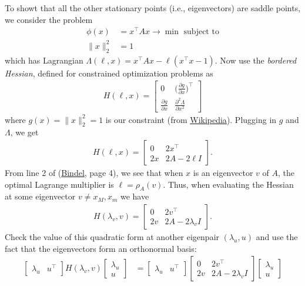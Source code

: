 \documentclass{letter}
\newcounter{problem}
\newcommand{\T}{\intercal}
\begin{document}
{    To showt that all the other stationary points (i.e., eigenvectors) are saddle points, we consider the problem \begin{align*}
        \phi(x) &= x^\T A x \rightarrow \min \text{ subject to} \\
        \|x\|_2^2 &= 1
    \end{align*} which has Lagrangian $\Lambda(\ell,x) = x^\T A x - \ell (x^\T x - 1)$. Now use the \emph{bordered Hessian}, defined for constrained optimization problems as \begin{align*}
        H(\ell,x) = \begin{bmatrix} 0 & \Big(\frac{\partial g}{\partial x}\Big)^\T \\ \frac{\partial g}{\partial x} & \frac{\partial^2 \Lambda}{\partial x^2} \end{bmatrix}
    \end{align*} where $g(x) = \|x\|_2^2 = 1$ is our constraint (from \href{https://en.wikipedia.org/wiki/Hessian_matrix\#Bordered_Hessian}{Wikipedia}). Plugging in $g$ and $\Lambda$, we get \begin{align*}
        H(\ell,x) = \begin{bmatrix} 0 & 2x^\T \\ 2x & 2A - 2\ell I \end{bmatrix}.
    \end{align*} From line 2 of (\href{http://www.cs.cornell.edu/~bindel/class/sjtu-summer19/lec/2019-05-29.pdf}{Bindel}, page 4), we see that when $x$ is an eigenvector $v$ of $A$, the optimal Lagrange multiplier is $\ell = \rho_A(v)$. Thus, when evaluating the Hessian at some eigenvector $v \neq x_M, x_m$ we have \begin{align*}
        H(\lambda_v, v) = \begin{bmatrix} 0 & 2v^\T \\ 2v & 2A - 2\lambda_vI \end{bmatrix}.
    \end{align*} Check the value of this quadratic form at another eigenpair $(\lambda_u, u)$ and use the fact that the eigenvectors form an orthonormal basis: \begin{align*}
        \begin{bmatrix} \lambda_u & u^\T \end{bmatrix} H(\lambda_v, v) \begin{bmatrix} \lambda_u \\ u \end{bmatrix} &= \begin{bmatrix} \lambda_u & u^\T \end{bmatrix} \begin{bmatrix} 0 & 2v^\T \\ 2v & 2A - 2\lambda_vI \end{bmatrix} \begin{bmatrix} \lambda_u \\ u \end{bmatrix} \\

\end{align*}}
\end{document}
